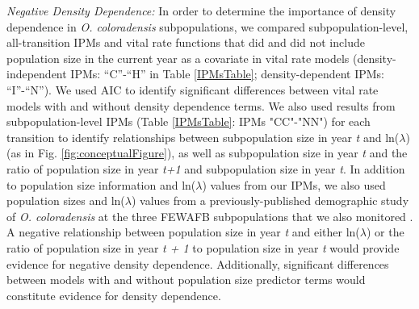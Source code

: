 \documentclass[12pt, letterpaper]{article}
\begin{document}
\textit{Negative Density Dependence:} In order to determine the importance of density dependence in \textit{O. coloradensis} subpopulations, we compared subpopulation-level, all-transition IPMs and vital rate functions that did and did not include population size in the current year as a covariate in vital rate models (density-independent IPMs: “C”-“H” in Table \ref{IPMsTable}; density-dependent IPMs: “I”-“N”). We used AIC to identify significant differences between vital rate models with and without density dependence terms. We also used results from subpopulation-level IPMs (Table \ref{IPMsTable}: IPMs "CC"-"NN") for each transition to identify relationships between subpopulation size in year \textit{t}  and ln($\lambda$) (as in Fig. \ref{fig:conceptualFigure}), as well as subpopulation size in year \textit{t} and the ratio of population size in year \textit{t+1 }and subpopulation size in year \textit{t}. In addition to population size information and ln($\lambda$) values from our IPMs, we also used population sizes and ln($\lambda$) values from a previously-published demographic study of \textit{O. coloradensis} at the three FEWAFB subpopulations that we also monitored \cite{Floyd1998}.  A negative relationship between population size in year \textit{t} and either ln($\lambda$) or the ratio of population size in year \textit{t + 1} to population size in year \textit{t} would provide evidence for negative density dependence. Additionally, significant differences between models with and without population size predictor terms would constitute evidence for density dependence.  
\end{document}
